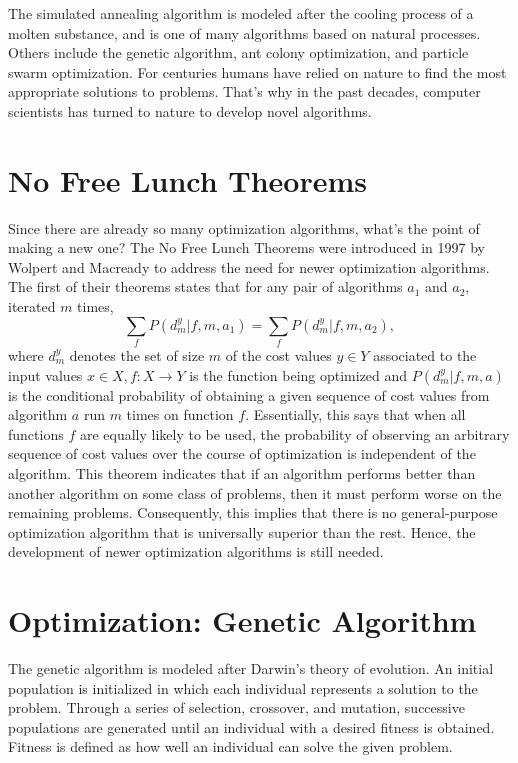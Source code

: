 The simulated annealing algorithm is modeled after the cooling process of a molten substance, and is one of many algorithms based on natural processes. Others include the genetic algorithm, ant colony optimization, and particle swarm optimization. For centuries humans have relied on nature to find the most appropriate solutions to problems. That's why in the past decades, computer scientists has turned to nature to develop novel algorithms.

\section{No Free Lunch Theorems}
Since there are already so many optimization algorithms, what's the point of making a new one? The No Free Lunch Theorems were introduced in 1997 by Wolpert and Macready to address the need for newer optimization algorithms. The first of their theorems states that for any pair of algorithms $a_1$ and $a_2$, iterated $m$ times, $$ \sum_{f} P(d_{m}^{y}|f,m,a_1)=\sum_{f} P(d_{m}^{y}|f,m,a_2),$$ where $d_m^y$ denotes the set of size $m$ of the cost values $y\in Y$ associated to the input values $x\in X,f:X\to Y$ is the function being optimized and $P(d_m^y|f,m,a)$ is the conditional probability of obtaining a given sequence of cost values from algorithm $a$ run $m$ times on function $f$. Essentially, this says that when all functions $f$ are equally likely to be used, the probability of observing an arbitrary sequence of cost values over the course of optimization is independent of the algorithm.
This theorem indicates that if an algorithm performs better than another algorithm on some class of problems, then it must perform worse on the remaining problems. Consequently, this implies that there is no general-purpose optimization algorithm that is universally superior than the rest. Hence, the development of newer optimization algorithms is still needed.

\section{Optimization: Genetic Algorithm}
The genetic algorithm \cite{holland_2010} is modeled after Darwin’s theory of evolution. An initial population is initialized in which each individual represents a solution to the problem. Through a series of selection, crossover, and mutation, successive populations are generated until an individual with a desired fitness is obtained. Fitness is defined as how well an individual can solve the given problem.

